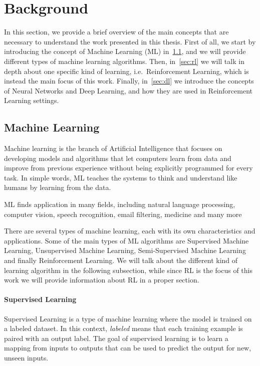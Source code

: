 
\chapter{Background}
\label{sec:background}
In this section, we provide a brief overview of the main concepts that are necessary to understand the work presented in this thesis.
First of all, we start by introducing the concept of Machine Learning (ML) in~\ref{sec:machine_learning}, and we will provide different types of machine learning algorithms.
Then, in~\ref{sec:rl} we will talk in depth about one specific kind of learning, i.e.\ Reinforcement Learning, which is instead the main focus of this work.
Finally, in~\ref{sec:dl} we introduce the concepts of Neural Networks and Deep Learning, and how they are used in Reinforcement Learning settings.

\section{Machine Learning}
\label{sec:machine_learning}

Machine learning is the branch of Artificial Intelligence that focuses on developing models and algorithms that let computers learn from data and improve from previous experience without being explicitly programmed for every task.
In simple words, ML teaches the systems to think and understand like humans by learning from the data.

ML finds application in many fields, including natural language processing, computer vision, speech recognition, email filtering, medicine and many more

There are several types of machine learning, each with its own characteristics and applications.
Some of the main types of ML algorithms are Supervised Machine Learning, Unsupervised Machine Learning, Semi-Supervised Machine Learning and finally Reinforcement Learning.
We will talk about the different kind of learning algorithm in the following subsection, while since RL is the focus of this work we will provide information about RL in a proper section.

\subsubsection{Supervised Learning}
\label{subsubsec:supervised_ml}
Supervised Learning is a type of machine learning where the model is trained on a labeled dataset.
In this context, \textit{labeled} means that each training example is paired with an output label.
The goal of supervised learning is to learn a mapping from inputs to outputs that can be used to predict the output for new, unseen inputs.


